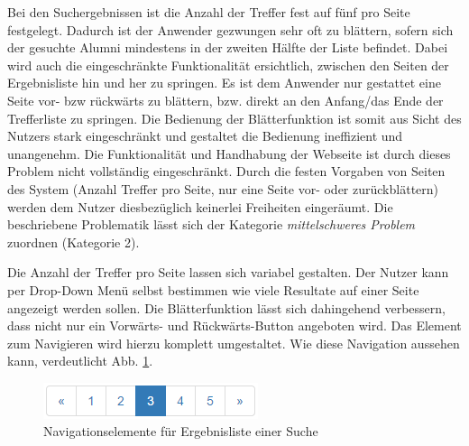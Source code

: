 {
	Bei den Suchergebnissen ist die Anzahl der Treffer fest auf fünf pro Seite festgelegt. Dadurch ist der Anwender gezwungen sehr oft zu blättern, sofern sich der gesuchte Alumni mindestens in der zweiten Hälfte der Liste befindet. Dabei wird auch die eingeschränkte Funktionalität ersichtlich, zwischen den Seiten der Ergebnisliste hin und her zu springen. Es ist dem Anwender nur gestattet eine Seite vor- bzw rückwärts zu blättern, bzw. direkt an den Anfang/das Ende der Trefferliste zu springen. Die Bedienung der Blätterfunktion ist somit aus Sicht des Nutzers stark eingeschränkt und gestaltet die Bedienung ineffizient und unangenehm.
}
{
	Die Funktionalität und Handhabung der Webseite ist durch dieses Problem nicht vollständig eingeschränkt. Durch die festen Vorgaben von Seiten des System (Anzahl Treffer pro Seite, nur eine Seite vor- oder zurückblättern) werden dem Nutzer diesbezüglich keinerlei Freiheiten eingeräumt. Die beschriebene Problematik lässt sich der Kategorie \emph{mittelschweres Problem} zuordnen (Kategorie 2).
}
{
	Die Anzahl der Treffer pro Seite lassen sich variabel gestalten. Der Nutzer kann per Drop-Down Menü selbst bestimmen wie viele Resultate auf einer Seite angezeigt werden sollen. Die Blätterfunktion lässt sich dahingehend verbessern, dass nicht nur ein Vorwärts- und Rückwärts-Button angeboten wird. Das Element zum Navigieren wird hierzu komplett umgestaltet. Wie diese Navigation aussehen kann, verdeutlicht Abb. \ref{fig:suche:pagination}.
	
	\begin{figure}[h]
		\centering
		\includegraphics[scale=0.75]{figures/pagination.png}
		\caption{Navigationselemente für Ergebnisliste einer Suche}
		\label{fig:suche:pagination}
	\end{figure}
}
\label{prob:suche:trefferanzahl}